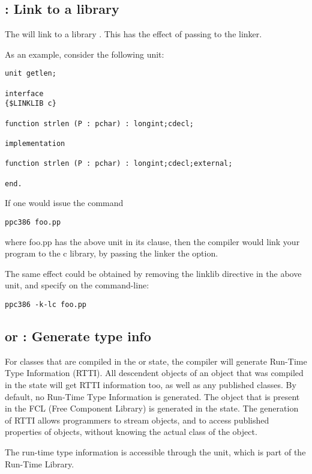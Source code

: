 \subsection{ : Link to a library}
\label{se:linklib}

The  will link to a library .
This has the effect of passing  to the linker.

As an example, consider the following unit:
\begin{verbatim}
unit getlen;

interface
{$LINKLIB c}

function strlen (P : pchar) : longint;cdecl;

implementation

function strlen (P : pchar) : longint;cdecl;external;

end.
\end{verbatim}
If one would issue the command
\begin{verbatim}
ppc386 foo.pp
\end{verbatim}
where foo.pp has the above unit in its  clause,
then the compiler would link your program to the c library, by passing the
linker the  option.

The same effect could be obtained by removing the linklib directive in the
above unit, and specify  on the command-line:
\begin{verbatim}
ppc386 -k-lc foo.pp
\end{verbatim}

\subsection{ or  : Generate type info}

For classes that are compiled in the  or 
state, the compiler will generate Run-Time Type Information (RTTI). All
descendent objects of an object that was compiled in the  state
will get RTTI information too, as well as any published classes.
By default, no Run-Time Type Information is generated. The 
object that is present in the FCL (Free Component Library) is generated in
the  state. The generation of RTTI allows programmers to
stream objects, and to access published properties of objects, without
knowing the actual class of the object.

The run-time type information is accessible through the  unit,
which is part of the \fpc Run-Time Library.


